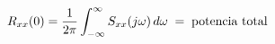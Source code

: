 \documentclass[preview]{standalone}
\begin{document}
\begin{align*}
\special{dvisvgm:raw <g id='unique000'>}R_{xx}(0)=\frac{1}{2\pi}\int_{-\infty}^{\infty}S_{xx}(j\omega)\,d\omega \;=\; \text{potencia total}\special{dvisvgm:raw </g>}
\end{align*}
\end{document}

